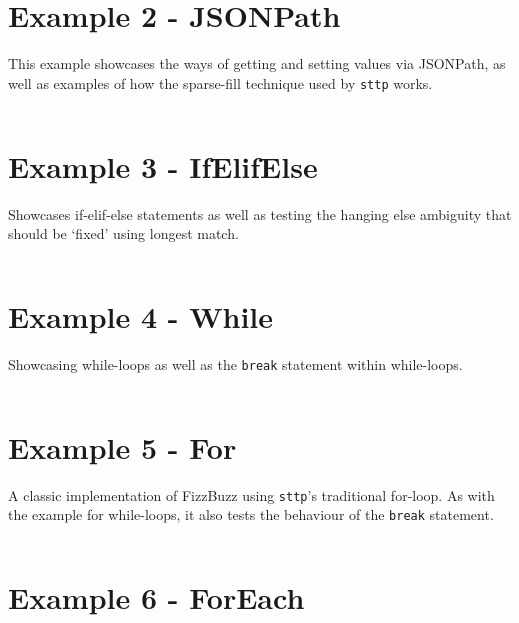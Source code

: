 \documentclass[]{full}
\theoremstyle{definition}
\begin{document}
\inputminted[autogobble, breaklines, tabsize=4]{text}{../../src/_examples/example_01/example_01.sttp}

\section{Example 2 - JSONPath}
\label{appendix:sttp-examples-2}

This example showcases the ways of getting and setting values via JSONPath, as well as examples of how the sparse-fill technique used by \verb|sttp| works.

\inputminted[autogobble, breaklines, tabsize=4]{text}{../../src/_examples/example_02/example_02.sttp}

\section{Example 3 - IfElifElse}
\label{appendix:sttp-examples-3}

Showcases if-elif-else statements as well as testing the hanging else ambiguity that should be `fixed' using longest match.

\inputminted[autogobble, breaklines, tabsize=4]{text}{../../src/_examples/example_03/example_03.sttp}

\section{Example 4 - While}
\label{appendix:sttp-examples-4}

Showcasing while-loops as well as the \verb|break| statement within while-loops.

\inputminted[autogobble, breaklines, tabsize=4]{text}{../../src/_examples/example_04/example_04.sttp}

\section{Example 5 - For}
\label{appendix:sttp-examples-5}

A classic implementation of FizzBuzz using \verb|sttp|'s traditional for-loop. As with the example for while-loops, it also tests the behaviour of the \verb|break| statement.

\inputminted[autogobble, breaklines, tabsize=4]{text}{../../src/_examples/example_05/example_05.sttp}

\section{Example 6 - ForEach}
\label{appendix:sttp-examples-6}
\end{document}
